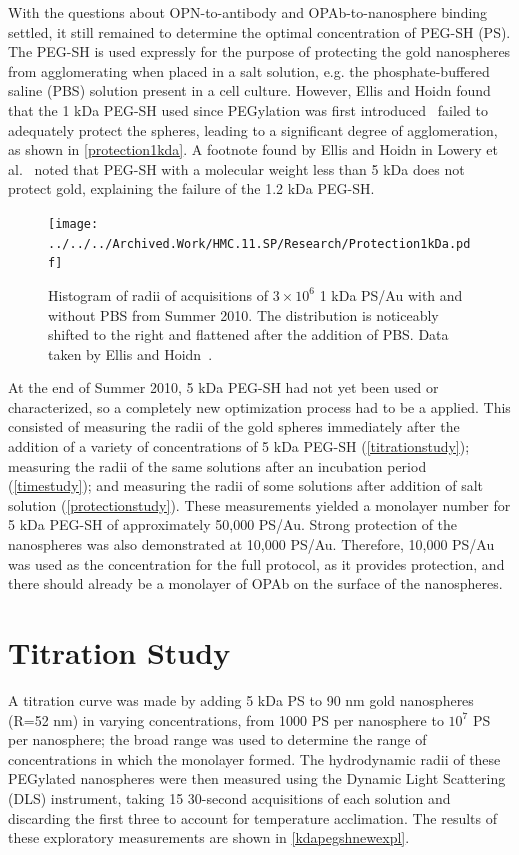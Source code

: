 With the questions about OPN-to-antibody and OPAb-to-nanosphere binding settled, it still remained to determine the optimal concentration of PEG-SH (PS). The PEG-SH is used expressly for the purpose of protecting the gold nanospheres from agglomerating when placed in a salt solution, e.g. the phosphate-buffered saline (PBS) solution present in a cell culture. However, Ellis and Hoidn found that the 1 kDa PEG-SH used since PEGylation was first introduced~\citep{warren} failed to adequately protect the spheres, leading to a significant degree of agglomeration, as shown in \autoref{protection1kda}. A footnote found by Ellis and Hoidn in Lowery et al.~\citep{westpegylation} noted that PEG-SH with a molecular weight less than 5 kDa does not protect gold, explaining the failure of the 1.2 kDa PEG-SH.

\begin{figure}[htbp]
\centering
\texttt{[image: ../../../Archived.Work/HMC.11.SP/Research/Protection1kDa.pdf]}
\caption{Histogram of radii of acquisitions of $3\times10^6$ 1 kDa PS\slash Au with and without PBS from Summer 2010. The distribution is noticeably shifted to the right and flattened after the addition of PBS. Data taken by Ellis and Hoidn~\citep{hoidnellis}.}
\label{protection1kda}
\end{figure}



At the end of Summer 2010, 5 kDa PEG-SH had not yet been used or characterized, so a completely new optimization process had to be a applied. This consisted of measuring the radii of the gold spheres immediately after the addition of a variety of concentrations of 5 kDa PEG-SH (\autoref{titrationstudy}); measuring the radii of the same solutions after an incubation period (\autoref{timestudy}); and measuring the radii of some solutions after addition of salt solution (\autoref{protectionstudy}). These measurements yielded a monolayer number for 5 kDa PEG-SH of approximately 50,000 PS\slash Au. Strong protection of the nanospheres was also demonstrated at 10,000 PS\slash Au. Therefore, 10,000 PS\slash Au was used as the concentration for the full protocol, as it provides protection, and there should already be a monolayer of OPAb on the surface of the nanospheres.

\section{Titration Study}
\label{titrationstudy}

A titration curve was made by adding 5 kDa PS to 90 nm gold nanospheres (R=52 nm) in varying concentrations, from 1000 PS per nanosphere to $10^7$ PS per nanosphere; the broad range was used to determine the range of concentrations in which the monolayer formed. The hydrodynamic radii of these PEGylated nanospheres were then measured using the Dynamic Light Scattering (DLS) instrument, taking 15 30-second acquisitions of each solution and discarding the first three to account for temperature acclimation. The results of these exploratory measurements are shown in \autoref{kdapegshnewexpl}.

